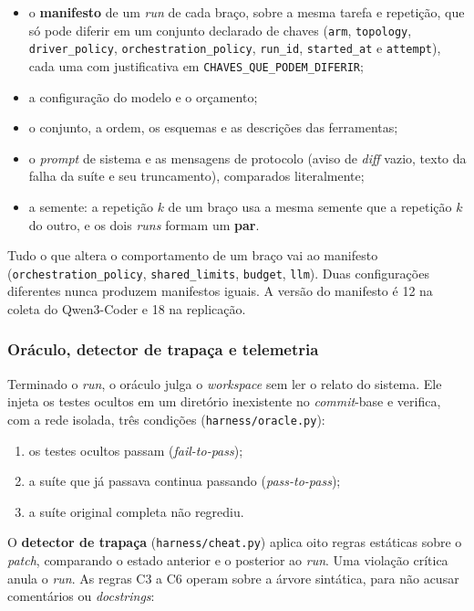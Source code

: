 \begin{itemize}
    \item o \textbf{manifesto} de um \textit{run} de cada braço, sobre a mesma tarefa e repetição, que só pode diferir em um conjunto declarado de chaves (\texttt{arm}, \texttt{topology}, \texttt{driver\_policy}, \texttt{orchestration\_policy}, \texttt{run\_id}, \texttt{started\_at} e \texttt{attempt}), cada uma com justificativa em \texttt{CHAVES\_QUE\_PODEM\_DIFERIR};
    \item a configuração do modelo e o orçamento;
    \item o conjunto, a ordem, os esquemas e as descrições das ferramentas;
    \item o \textit{prompt} de sistema e as mensagens de protocolo (aviso de \textit{diff} vazio, texto da falha da suíte e seu truncamento), comparados literalmente;
    \item a semente: a repetição $k$ de um braço usa a mesma semente que a repetição $k$ do outro, e os dois \textit{runs} formam um \textbf{par}.
\end{itemize}

Tudo o que altera o comportamento de um braço vai ao manifesto (\texttt{orchestration\_policy}, \texttt{shared\_limits}, \texttt{budget}, \texttt{llm}). Duas configurações diferentes nunca produzem manifestos iguais. A versão do manifesto é 12 na coleta do Qwen3-Coder e 18 na replicação.

\subsubsection{Oráculo, detector de trapaça e telemetria}

Terminado o \textit{run}, o oráculo julga o \textit{workspace} sem ler o relato do sistema. Ele injeta os testes ocultos em um diretório inexistente no \textit{commit}-base e verifica, com a rede isolada, três condições (\texttt{harness/oracle.py}):

\begin{enumerate}
    \item os testes ocultos passam (\textit{fail-to-pass});
    \item a suíte que já passava continua passando (\textit{pass-to-pass});
    \item a suíte original completa não regrediu.
\end{enumerate}

O \textbf{detector de trapaça} (\texttt{harness/cheat.py}) aplica oito regras estáticas sobre o \textit{patch}, comparando o estado anterior e o posterior ao \textit{run}. Uma violação crítica anula o \textit{run}. As regras C3 a C6 operam sobre a árvore sintática, para não acusar comentários ou \textit{docstrings}:

